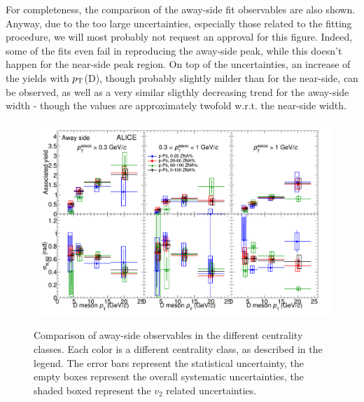 For completeness, the comparison of the away-side fit observables are also shown. Anyway, due to the too large uncertainties, especially those related to the fitting procedure, we will most probably not request an approval for this figure. Indeed, some of the fits even fail in reproducing the away-side peak, while this doesn't happen for the near-side peak region. On top of the uncertainties, an increase of the yields with $p_{\rm T}$(D), though probably slightly milder than for the near-side, can be observed, as well as a very similar sligthly decreasing trend for the away-side width - though the values are approximately twofold w.r.t. the near-side width.

\begin{landscape}
\begin{figure}
\centering
{\includegraphics[width=0.95\linewidth]{figuresVsCent/Averages/Trends/ComparePPbVsCentFitResults_AwaySide.png}}
 \caption{Comparison of away-side observables in the different centrality classes. Each color is a different centrality class, as described in the legend. The error bars represent the statistical uncertainty, the empty boxes represent the overall systematic uncertainties, the shaded boxed represent the $v_2$ related uncertainties.}
\label{fig:prel3}
\end{figure}
 \end{landscape}